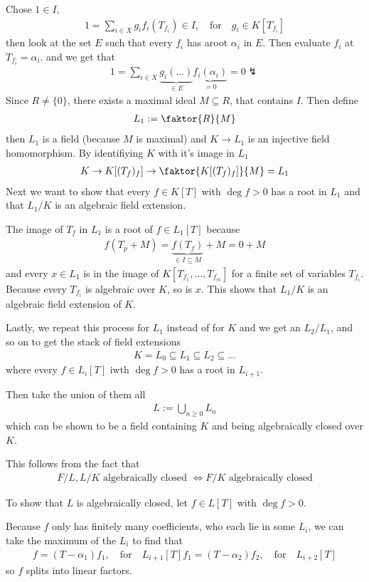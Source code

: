 Chose $1\in I$,
\begin{align*}
	1 = \sum_{i \in X}g_i f_i(T_{f_i}) \in I, \quad \text{for} \quad g_i \in K[T_{f_i}]
\end{align*}
then look at the set $E$ such that every $f_i$ has aroot $\alpha_i$ in $E$. Then evaluate $f_i$ at $T_{f_i} = \alpha_i$. and we get that
\begin{align*}
	1 = \sum_{i \in X} \underbrace{g_i(\ldots)}_{\in E} \underbrace{f_i(\alpha_i)}_{= 0} = 0 \lightning
\end{align*}
Since $R \neq \{0\}$, there exists a maximal ideal $M \subseteq R$, that contains $I$. Then define
\begin{align*}
	L_1 := \faktor{R}{M}
\end{align*}
then $L_1$ is a field (because $M$ is maximal) and $K \to L_1$ is an injective field homomorphism.
By identifiying $K$ with it's image in $L_1$
\begin{align*}
	K \rightarrow K[(T_f)_f] \to \faktor{K[(T_f)_f]}{M} = L_1
\end{align*}
Next we want to show that every $f \in K[T]$ with $\deg f > 0$ has a root in $L_1$ and that $L_1/K$ is an algebraic field extension.

The image of $T_f$ in $L_1$ is a root of $f \in L_1[T]$ because
\begin{align*}
	f(T_p + M) = \underbrace{f(T_f)}_{\in I \subseteq M} + M = 0 + M 
\end{align*}
and every $x \in L_1$ is in the image of $K[T_{f_1}, \ldots, T_{f_m}]$ for a finite set of variables $T_{f_i}$. Because every $T_{f_i}$ is algebraic over $K$, so is $x$.
This shows that $L_1/K$ is an algebraic field extension of $K$.

Lastly, we repeat this process for $L_1$ instead of for $K$ and we get an $L_2/L_1$, and so on to get the stack of field extensions
\begin{align*}
	K = L_0 \subseteq L_1 \subseteq L_2 \subseteq \ldots
\end{align*}
where every $f \in L_i[T]$ iwth $\deg f > 0$ has a root in $L_{i+1}$.

Then take the union of them all
\begin{align*}
	L := \bigcup_{n \geq 0}L_n
\end{align*}
which can be shown to be a field containing $K$ and being algebraically closed over $K$.

This follows from the fact that
\begin{align*}
	F/L, L/K \text{ algebraically closed } \iff F/K \text{ algebraically closed}
\end{align*}

To show that $L$ is algebraically closed, let $f \in L[T]$ with $\deg f > 0$.

Because $f$ only has finitely many coefficients, who each lie in some $L_i$, we can take the maximum of the $L_i$ to find that
\begin{align*}
	f = (T - \alpha_1)f_1, \quad \text{for} \quad L_{i+1}[T]
	f_1 = (T - \alpha_2)f_2, \quad \text{for} \quad L_{i+2}[T]
\end{align*}
so $f$ splits into linear factors.
